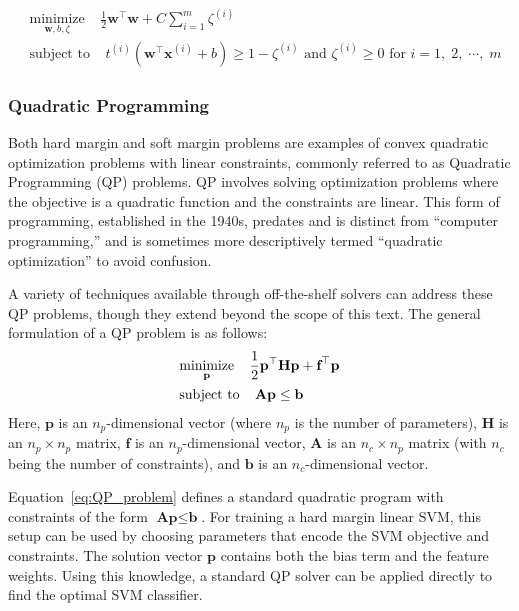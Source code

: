 \documentclass[12pt,letter]{article}
\begin{document}
\begin{equation}
\begin{split}
    & \underset{\textbf{w}, b, \zeta}{\text{minimize}} \;\;\;\; \frac{1}{2}\textbf{w}^{\top}\textbf{w} + C \sum_{i=1}^{m} \zeta^{(i)} \\  
    & \text{subject to} \;\;\;\; t^{(i)}(\textbf{w}^{\top}\textbf{x}^{(i)}+b ) \ge 1 - \zeta^{(i)} \text{ and } \zeta^{(i)} \ge 0 \text{ for } i=1, \; 2, \; \cdots,  \; m 
\end{split}
\end{equation}

\subsubsection{Quadratic Programming}
Both hard margin and soft margin problems are examples of convex quadratic optimization problems with linear constraints, commonly referred to as Quadratic Programming (QP) problems. QP involves solving optimization problems where the objective is a quadratic function and the constraints are linear. This form of programming, established in the 1940s, predates and is distinct from ``computer programming,'' and is sometimes more descriptively termed ``quadratic optimization'' to avoid confusion.

A variety of techniques available through off-the-shelf solvers can address these QP problems, though they extend beyond the scope of this text. The general formulation of a QP problem is as follows:
\begin{equation}
\begin{split}
    & \underset{\textbf{p}}{\text{minimize}} \;\;\;\; \frac{1}{2}\textbf{\textbf{p}}^{\top}\textbf{H}\textbf{p} + \textbf{f}^{\top}\textbf{p}\\
    & \text{subject to} \;\;\;\; \textbf{A} \textbf{p} \le \textbf{b}
\end{split}
\label{eq:QP_problem}
\end{equation}
Here, $\textbf{p}$ is an $n_p$-dimensional vector (where $n_p$ is the number of parameters), $\textbf{H}$ is an $n_p \times n_p$ matrix, $\textbf{f}$ is an $n_p$-dimensional vector, $\textbf{A}$ is an $n_c \times n_p$ matrix (with $n_c$ being the number of constraints), and $\textbf{b}$ is an $n_c$-dimensional vector. 

Equation~\ref{eq:QP_problem} defines a standard quadratic program with constraints of the form $\textbf{A} \textbf{p} \le \textbf{b}$. For training a hard margin linear SVM, this setup can be used by choosing parameters that encode the SVM objective and constraints. The solution vector $\textbf{p}$ contains both the bias term and the feature weights. Using this knowledge, a standard QP solver can be applied directly to find the optimal SVM classifier.
\end{document}
